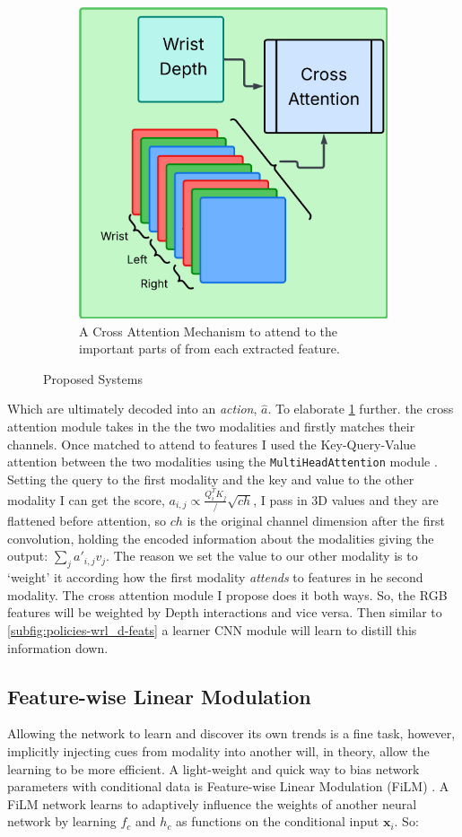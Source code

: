 \begin{figure}[htpb]
\begin{subfigure}{0.45\linewidth}
    \centering
    \includegraphics[width=0.3\linewidth]{assets/cam-comb/policies/wlr_d-attn-diagram.png}
    \caption{A Cross Attention Mechanism to attend to the important parts of from each extracted feature.}\label{subfig:policies-wrl_d-attn}
  \end{subfigure}
  \caption{Proposed Systems}\label{fig:policies-sep-dep-diagrams}
\end{figure}
Which are ultimately decoded into an \emph{action}, $\hat{a}$. To elaborate \ref{subfig:policies-wrl_d-attn} further. the cross attention module takes in the the two modalities and firstly matches their channels. Once matched to attend to features I used the Key-Query-Value attention \cite{vaswani2023attentionneed} between the two modalities using the \verb|MultiHeadAttention| module \cite{pytorch}. Setting the query to the first modality and the key and value to the other modality I can get the score, \( a_{i, j} \propto \frac{Q_i^TK_j}/\sqrt{ch}\), I pass in 3D values and they are flattened before attention, so $ch$ is the original channel dimension after the first convolution, holding the encoded information about the modalities giving the output: \(\sum_{j}{{a'}_{i, j}v_j}\). The reason we set the value to our other modality is to `weight' it according how the first modality \emph{attends} to features in he second modality. The cross attention module I propose does it both ways. So, the RGB features will be weighted by Depth interactions and vice versa. Then similar to \ref{subfig:policies-wrl_d-feats} a learner CNN module will learn to distill this information down.


\subsection{Feature-wise Linear Modulation}\label{subsec:policies-film}
Allowing the network to learn and discover its own trends is a fine task, however, implicitly injecting cues from modality into another will, in theory, allow the learning to be more efficient. A light-weight and quick way to bias network parameters with conditional data is Feature-wise Linear Modulation (FiLM) \cite{perez2017film}. A FiLM network learns to adaptively influence the weights of another neural network by learning $f_c$ and $h_c$ as functions on the conditional input $\mathbf{x}_i$. So:

